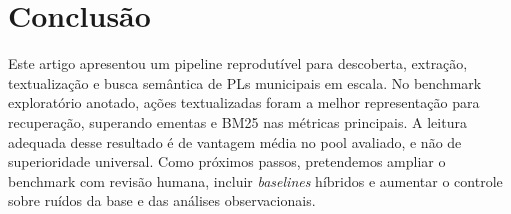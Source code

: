 \section{Conclusão}

Este artigo apresentou um pipeline reprodutível para descoberta, extração, textualização e busca semântica de PLs municipais em escala. No benchmark exploratório anotado, ações textualizadas foram a melhor representação para recuperação, superando ementas e BM25 nas métricas principais. A leitura adequada desse resultado é de vantagem média no pool avaliado, e não de superioridade universal. Como próximos passos, pretendemos ampliar o benchmark com revisão humana, incluir \textit{baselines} híbridos e aumentar o controle sobre ruídos da base e das análises observacionais.
